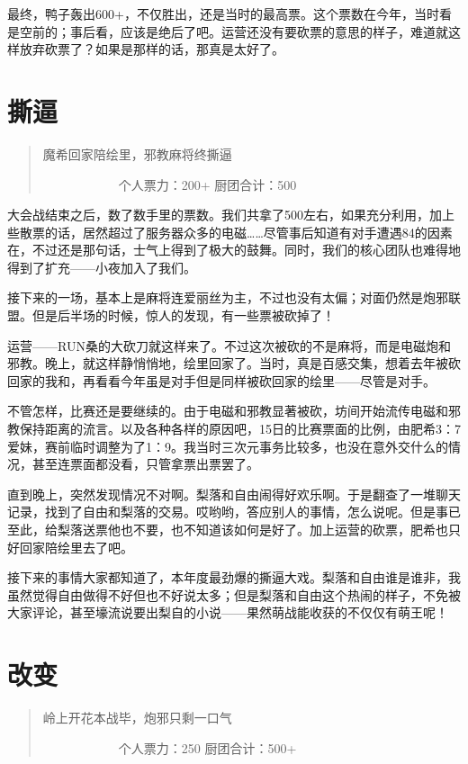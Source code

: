 最终，鸭子轰出600+，不仅胜出，还是当时的最高票。这个票数在今年，当时看是空前的；事后看，应该是绝后了吧。运营还没有要砍票的意思的样子，难道就这样放弃砍票了？如果是那样的话，那真是太好了。


\section{撕逼}
\begin{quote}
魔希回家陪绘里，邪教麻将终撕逼

　　　　　　个人票力：200+ 厨团合计：500
\end{quote}

大会战结束之后，数了数手里的票数。我们共拿了500左右，如果充分利用，加上些散票的话，居然超过了服务器众多的电磁……尽管事后知道有对手遭遇84的因素在，不过还是那句话，士气上得到了极大的鼓舞。同时，我们的核心团队也难得地得到了扩充——小夜加入了我们。

接下来的一场，基本上是麻将连爱丽丝为主，不过也没有太偏；对面仍然是炮邪联盟。但是后半场的时候，惊人的发现，有一些票被砍掉了！

运营——RUN桑的大砍刀就这样来了。不过这次被砍的不是麻将，而是电磁炮和邪教。晚上，就这样静悄悄地，绘里回家了。当时，真是百感交集，想着去年被砍回家的我和，再看看今年虽是对手但是同样被砍回家的绘里——尽管是对手。

不管怎样，比赛还是要继续的。由于电磁和邪教显著被砍，坊间开始流传电磁和邪教保持距离的流言。以及各种各样的原因吧，15日的比赛票面的比例，由肥希3：7爱妹，赛前临时调整为了1：9。我当时三次元事务比较多，也没在意外交什么的情况，甚至连票面都没看，只管拿票出票罢了。

直到晚上，突然发现情况不对啊。梨落和自由闹得好欢乐啊。于是翻查了一堆聊天记录，找到了自由和梨落的交易。哎哟哟，答应别人的事情，怎么说呢。但是事已至此，给梨落送票他也不要，也不知道该如何是好了。加上运营的砍票，肥希也只好回家陪绘里去了吧。

接下来的事情大家都知道了，本年度最劲爆的撕逼大戏。梨落和自由谁是谁非，我虽然觉得自由做得不好但也不好说太多；但是梨落和自由这个热闹的样子，不免被大家评论，甚至壕流说要出梨自的小说——果然萌战能收获的不仅仅有萌王呢！


\section{改变}
\begin{quote}
岭上开花本战毕，炮邪只剩一口气

　　　　　　个人票力：250 厨团合计：500+
\end{quote}

